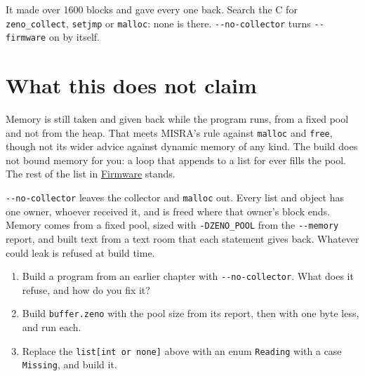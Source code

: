 \begin{zeno}[src=examples/buffer.zeno, file=buffer.zeno, show=no, cmd=zeno build --no-collector --memory buffer.zeno > /dev/null ;; ./buffer]
\end{zeno}

It made over 1600 blocks and gave every one back. Search the C for
\verb|zeno_collect|, \verb|setjmp| or \verb|malloc|: none is there.
\verb|--no-collector| turns \verb|--firmware| on by itself.

\section{What this does not claim}

Memory is still taken and given back while the program runs, from a
fixed pool and not from the heap. That meets MISRA's rule against
\verb|malloc| and \verb|free|, though not its wider advice against
dynamic memory of any kind. The build does not bound memory for you: a
loop that appends to a list for ever fills the pool. The rest of the
list in \hyperref[ch-firmware]{Firmware} stands.

\begin{summary}
\verb|--no-collector| leaves the collector and \verb|malloc| out.
Every list and object has one owner, whoever received it, and is freed
where that owner's block ends. Memory comes from a fixed pool, sized
with \verb|-DZENO_POOL| from the \verb|--memory| report, and built text
from a text room that each statement gives back. Whatever could leak is
refused at build time.
\end{summary}

\begin{tryit}
\begin{enumerate}
\item Build a program from an earlier chapter with
  \verb|--no-collector|. What does it refuse, and how do you fix it?
\item Build \verb|buffer.zeno| with the pool size from its report, then
  with one byte less, and run each.
\item Replace the \verb|list[int or none]| above with an enum
  \verb|Reading| with a case \verb|Missing|, and build it.
\end{enumerate}
\end{tryit}
